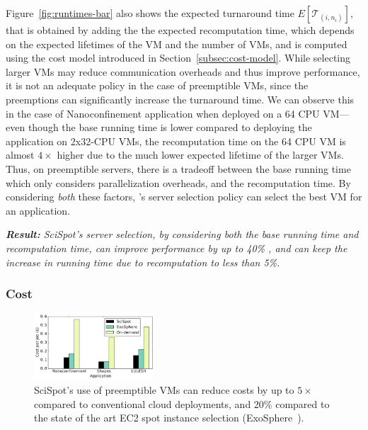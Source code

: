 Figure~\ref{fig:runtimes-bar} also shows the expected turnaround time $E[\mathcal{T}_{(i,n_i)}]$, that is obtained by adding the the expected recomputation time, which depends on the expected lifetimes of the VM and the number of VMs, and is computed using the cost model introduced in Section~\ref{subsec:cost-model}. 
While selecting larger VMs may reduce communication overheads and thus improve performance, it is not an adequate policy in the case of preemptible VMs, since the preemptions can significantly increase the turnaround time.
We can observe this in the case of Nanoconfinement application when deployed on a 64 CPU VM---even though the base running time is lower compared to deploying the application on 2x32-CPU VMs, the recomputation time on the 64 CPU VM is almost $4\times$ higher due to the much lower expected lifetime of the larger VMs. 
Thus, on preemptible servers, there is a tradeoff between the base running time which only considers parallelization overheads, and the recomputation time.
By considering \emph{both} these factors, \sysname's server selection policy can select the best VM for an application. 


\noindent \emph{\textbf{Result:} SciSpot's server selection, by considering both the base running time and recomputation time, can improve performance by up to 40\% , and can keep the increase in running time due to recomputation to less than 5\%.}

\subsubsection{Cost}


\begin{figure}
  \centering
  \includegraphics[width=0.4\textwidth]{../graphs/cost-vs-exosphere.pdf}
  \vspace*{\myfigspace}
  \caption{SciSpot's use of preemptible VMs can reduce costs by up to $5\times$ compared to conventional cloud deployments, and 20\% compared to the state of the art EC2 spot instance selection (ExoSphere~\cite{exosphere}).}
  \label{fig:cost-only-bar}
    \vspace*{\myfigspace}
\end{figure}

